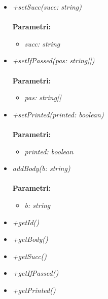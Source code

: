 \begin{itemize}
\begin{itemize}
\begin{itemize}
    		\end{itemize}
    		\item \emph{+setSucc(succ: string)}\\
    		\\
    		\textbf{Parametri:}
    		\begin{itemize}
    			\item \emph{succ: string}\\
    			
    		\end{itemize}
    		\item \emph{+setIfPassed(pas: string[])}\\
    		\\
    		\textbf{Parametri:}
    		\begin{itemize}
    			\item \emph{pas: string[]}\\
    			
    		\end{itemize}
    		\item \emph{+setPrinted(printed: boolean)}\\
    		\\
    		\textbf{Parametri:}
    		\begin{itemize}
    			\item \emph{printed: boolean}\\
    			
    		\end{itemize}
    		\item \emph{addBody(b: string)}\\
    		\\
    		\textbf{Parametri:}
    		\begin{itemize}
    			\item \emph{b: string}\\
    			
    		\end{itemize}
    		\item \emph{+getId()}\\
    		
    		\item \emph{+getBody()}\\
    		
    		\item \emph{+getSucc()}\\
    		
    		\item \emph{+getIfPassed()}\\
    		
    		\item \emph{+getPrinted()}\\
    		
    	\end{itemize}
\end{itemize}
